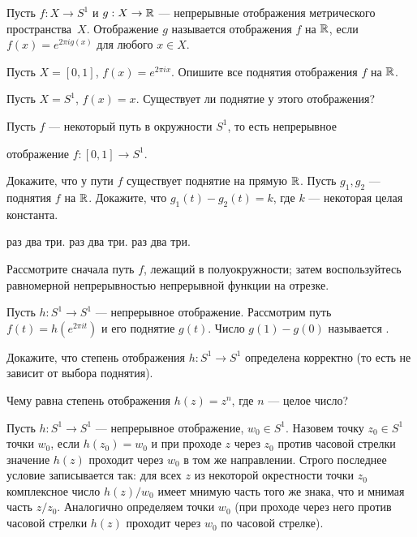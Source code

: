 \documentclass[a4paper,10pt]{article}
\newcommand{\0}[1]{\overline{#1}}
\begin{document}
Пусть $f:X\to S^1$ и $g:X\rightarrow \mathbb{R}$ --- непрерывные отображения
метрического пространства~$X$.
Отображение $g$ называется  отображения $f$ на $\mathbb{R}$,
если $f(x)=e^{2\pi ig(x)}$ для любого $x\in X$.

Пусть $X=[0,1]$, $f(x)=e^{2\pi ix}$. Опишите все
поднятия отображения $f$ на $\mathbb{R}$.

Пусть $X=S^1$, $f(x)=x$. Существует ли поднятие у этого отображения?




Пусть $f$ --- некоторый путь в окружности $S^1$, то есть непрерывное

отображение $f:[0,1]\to S^1$.

Докажите, что у пути $f$ существует поднятие на прямую $\mathbb{R}$.
Пусть $g_1,g_2$ --- поднятия $f$ на $\mathbb{R}$.
Докажите, что $g_1(t)-g_2(t)=k$, где $k$ --- некоторая целая константа.


  раз  два  три.
  раз  два  три.
  раз  два  три.



 Рассмотрите сначала путь $f$, лежащий в
полуокружности; затем  воспользуйтесь равномерной непрерывностью
непрерывной функции на отрезке.



Пусть $h:S^1\to S^1$ --- непрерывное отображение. Рассмотрим путь
$f(t)=h(e^{2\pi it})$ и его поднятие $g(t)$. Число $g(1)-g(0)$
называется .

Докажите, что степень отображения $h:S^1\to S^1$
определена корректно (то есть не зависит от выбора поднятия).

Чему равна степень отображения $h(z)=z^n$, где $n$ --- целое число?





Пусть $h:S^1\to S^1$ --- непрерывное отображение, $w_0\in S^1$. Назовем
точку $z_0\in S^1$  точки $w_0$, если
$h(z_0)=w_0$ и при проходе $z$ через $z_0$ против часовой стрелки
значение $h(z)$ проходит через $w_0$ в том же направлении. Строго
последнее условие записывается так: для всех $z$ из некоторой
окрестности точки $z_0$ комплексное число
$h(z)/w_0$ имеет мнимую часть того же знака, что и мнимая часть $z/z_0$.
Аналогично определяем  точки $w_0$ (при
проходе через него против часовой стрелки $h(z)$ проходит через $w_0$ по
часовой стрелке).
\end{document}
